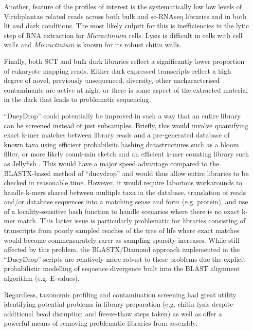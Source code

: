 Another, feature of the profiles of interest is the systematically low 
low levels of Viridiplantae related reads across both bulk and sc-RNAseq libraries and in both lit and dark conditions.  The most likely culprit for
this is inefficiencies in the lytic step of RNA extraction for \textit{Micractinium} cells. 
Lysis is difficult in cells
with cell walls \citep{Korfhage2015} and \textit{Micractinium} is known for its robust chitin walls. 

Finally, both SCT and bulk dark libraries reflect a significantly lower proportion of eukaryote mapping reads. Either dark expressed transcripts 
reflect a high degree of novel, previously unsequenced, diversity, other uncharacterised contaminants are active at night or there is some aspect
of the extracted material in the dark that leads to problematic sequencing.  


``DueyDrop'' could potentially be improved in such a way that an entire library can be screened instead of just subsamples.
Briefly, this would involve quantifying exact k-mer matches between library reads and a pre-generated database of known taxa
using efficient probabilstic hashing datastructures such as a bloom filter, or more likely count-min sketch and an efficient
k-mer counting library such as Jellyfish \citep{Marcais2011}.  This would have a major speed advantage compared to the BLASTX-based method of ``dueydrop''
and would thus allow entire libraries to be checked in reasonable time.  However, it would require laborious workarounds to handle
k-mers shared between multiple taxa in the database, translation of reads and/or database sequences into a matching sense and form (e.g. protein),
and use of a locality-sensitive hash function to handle scenarios where there is no exact k-mer match. This latter issue is particularly
problematic for libraries consisting of transcripts from poorly sampled reaches of the tree of life where exact matches would become
commensurately rarer as sampling sparsity increases.  
While still affected by this problem, the BLASTX/Diamond approach implemented in the ``DueyDrop'' scripts are relatively more robust to these
problems due the explicit probabilistic modelling of sequence divergence built into the BLAST alignment algorithm (e.g. E-values).

Regardless, taxonomic profiling and contamination screening had great utility identifying potential problems in library preparation (e.g. chitin lysis despite
additional bead disruption and freeze-thaw steps taken) as well as offer a powerful means of removing problematic libraries from assembly.






